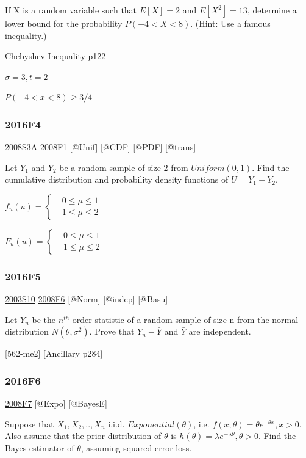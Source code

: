 \documentclass[6pt,Portrait]{article}
\begin{document}
If X is a random variable such that \(E[X]=2\) and \(E[X^2]=13\),
determine a lower bound for the probability \(P(-4<X<8)\). (Hint: Use a
famous inequality.)

Chebyshev Inequality p122

\(\sigma=3, t=2\)

\(P(-4<x<8)\ge3/4\)

\hypertarget{f4-6}{%
\subsubsection{2016F4}\label{f4-6}}

\protect\hyperlink{s3a}{2008S3A} \protect\hyperlink{f1-3}{2008F1}
{[}@Unif{]} {[}@CDF{]} {[}@PDF{]} {[}@trans{]}

Let \(Y_1\) and \(Y_2\) be a random sample of size 2 from
\(Uniform(0,1)\). Find the cumulative distribution and probability
density functions of \(U=Y_1+Y_2\).

\(f_u(u)=\begin{cases}&0\le\mu\le1\\&1\le\mu\le2\end{cases}\)

\(F_u(u)=\begin{cases}&0\le\mu\le1\\&1\le\mu\le2\end{cases}\)

\hypertarget{f5-6}{%
\subsubsection{2016F5}\label{f5-6}}

\protect\hyperlink{s10}{2003S10} \protect\hyperlink{f6-3}{2008F6}
{[}@Norm{]} {[}@indep{]} {[}@Basu{]}

Let \(Y_n\) be the \(n^{th}\) order statistic of a random sample of size
n from the normal distribution \(N(\theta,\sigma^2)\). Prove that
\(Y_n-\bar Y\) and \(\bar Y\) are independent.

{[}562-me2{]} {[}Ancillary p284{]}

\hypertarget{f6-5}{%
\subsubsection{2016F6}\label{f6-5}}

\protect\hyperlink{f7-3}{2008F7} {[}@Expo{]} {[}@BayesE{]}

Suppose that \(X_1,X_2,..,X_n\) i.i.d. \(Exponential(\theta)\), i.e.
\(f(x;\theta)=\theta e^{-\theta x},x>0\). Also assume that the prior
distribution of \(\theta\) is
\(h(\theta)=\lambda e^{-\lambda\theta},\theta>0\). Find the Bayes
estimator of \(\theta\), assuming squared error loss.
\end{document}
